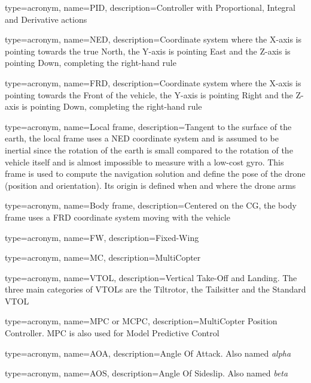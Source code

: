 {
	type=acronym,
	name={PID},
	description={Controller with Proportional, Integral and Derivative actions}
}

{
	type=acronym,
	name={NED},
	description={Coordinate system where the X-axis is pointing towards the true North, the Y-axis is pointing East and the Z-axis is pointing Down, completing the right-hand rule}
}

{
	type=acronym,
	name={FRD},
	description={Coordinate system where the X-axis is pointing towards the Front of the vehicle, the Y-axis is pointing Right and the Z-axis is pointing Down, completing the right-hand rule}
}

{
	type=acronym,
	name={Local frame},
	description={Tangent to the surface of the earth, the local frame uses a NED coordinate system and is assumed to be inertial since the rotation of the earth is small compared to the rotation of the vehicle itself and is almost impossible to measure with a low-cost gyro. This frame is used to compute the navigation solution and define the pose of the drone (position and orientation). Its origin is defined when and where the drone arms}
}

{
	type=acronym,
	name={Body frame},
	description={Centered on the CG, the body frame uses a FRD coordinate system moving with the vehicle}
}

{
	type=acronym,
	name={FW},
	description={Fixed-Wing}
}

{
	type=acronym,
	name={MC},
	description={MultiCopter}
}

{
	type=acronym,
	name={VTOL},
	description={Vertical Take-Off and Landing. The three main categories of VTOLs are the Tiltrotor, the Tailsitter and the Standard VTOL}
}

{
	type=acronym,
	name={MPC or MCPC},
	description={MultiCopter Position Controller. MPC is also used for Model Predictive Control}
}

{
	type=acronym,
	name={AOA},
	description={Angle Of Attack. Also named \textit{alpha}}
}

{
	type=acronym,
	name={AOS},
	description={Angle Of Sideslip. Also named \textit{beta}}
}
